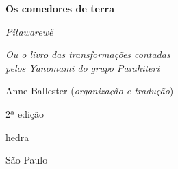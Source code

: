 




\begingroup\thispagestyle{empty}\vspace*{.05\textheight} 

              {\formular
              \huge
              \noindent
              \textbf{Os comedores de terra}

              \vspace{0.3em}

              \noindent\Large\textit{Pitawarewë}

              \vspace{0.5em}

              \noindent\normalsize\textit{Ou o livro das transformações contadas\\pelos Yanomami do  grupo Parahiteri}}

              \vspace{9.5em}
              
              {\small\noindent Anne Ballester (\textit{organização e tradução})}

              \bigskip

              \noindent
              {\small\noindent 2ª edição}

              \vfill

              \newfontfamily{}
              {\noindent\fontsize{30}{40}\selectfont \timesnewroman hedra}

              {\small\noindent São Paulo \quad\the\year}

\endgroup
\pagebreak
